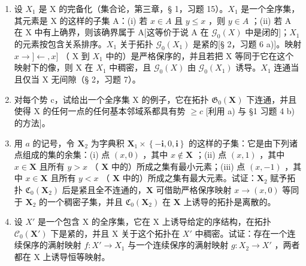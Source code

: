 \begin{enumerate}
\def\labelenumi{\alph{enumi})}
\item
设 \(X_{1}\) 是 X 的完备化（集合论，第三章，§ 1，习题 15）。\(X_{1}\) 是一个全序集，其元素是 X 的这样的子集 A：(i) 若 \(x \in A\) 且 \(y \leqslant x\) ，则 \(y \in A\) ；(ii) 若 A 在 X 中有上确界，则该确界属于 A{[}这等价于说 A 在 \(\mathcal{G}_{0}(X)\) 中是闭的{]}；\(X_{1}\) 的元素按包含关系排序。\(X_{1}\) 关于拓扑 \(\mathcal{G}_{0}(X_{1})\) 是紧的{[}§ 2，习题 6 a){]}。映射 \(x \to ]\leftarrow,x]\) （ X 到 \(X_{1}\) 中的）是严格保序的，并且若把 X 等同于它在这个映射下的像，则 X 在 \(X_{1}\) 中稠密，且 \(\mathcal{G}_{0}(X)\) 由 \(\mathcal{G}_{0}(X_{1})\) 诱导。\(X_{1}\) 连通当且仅当 X 无间隙（§ 2，习题 7）。
\item
对每个势 c，试给出一个全序集 X 的例子，它在拓扑 \(\mathfrak{G}_{0}(\mathbf{X})\) 下连通，并且使得 X 的任何一点的任何基本邻域系都具有势 \(\geqslant c\) {[}利用 a) 与 §1 习题 4 b) 的方法{]}。
\item
用 \(a\) 的记号，令 \(\mathbf{X}_{2}\) 为字典积 \(\mathbf{X}_{1} \times \left\{-\mathbf{i}, 0, \mathbf{i}\right\}\) 的这样的子集：它是由下列诸点组成的集的余集：(i) 点 \((x, 0)\) ，其中 \(x \notin \mathbf{X}\) ；(ii) 点 \((x, 1)\) ，其中 \(x \in \mathbf{X}\) 且所有 \(y > x\) （ \(\mathbf{X}\) 中的）所成之集有最小元素；(iii) 点 \((x, -1)\) ，其中 \(x \in \mathbf{X}\) 且所有 \(y < x\) （ \(\mathbf{X}\) 中的）所成之集有最大元素。试证：\(\mathbf{X}_{2}\) 赋予拓扑 \(\mathfrak{C}_{0}(\mathbf{X}_{2})\) 后是紧且全不连通的，\(\mathbf{X}\) 可借助严格保序映射 \(x \to (x, 0)\) 等同于 \(\mathbf{X}_{2}\) 的一个稠密子集，并且 \(\mathfrak{C}_{0}(\mathbf{X}_{2})\) 在 \(\mathbf{X}\) 上诱导的拓扑是离散的。
\item
设 \(X'\) 是一个包含 X 的全序集，它在 X 上诱导给定的序结构，在拓扑 \(\mathcal{C}_{0}(\mathbf{X}')\) 下是紧的，并且 X 关于这个拓扑在 \(X'\) 中稠密。试证：存在一个连续保序的满射映射 \(f: X' \to X_{1}\) 与一个连续保序的满射映射 \(g: X_{2} \to X'\) ，两者都在 X 上诱导恒等映射。
\end{enumerate}


